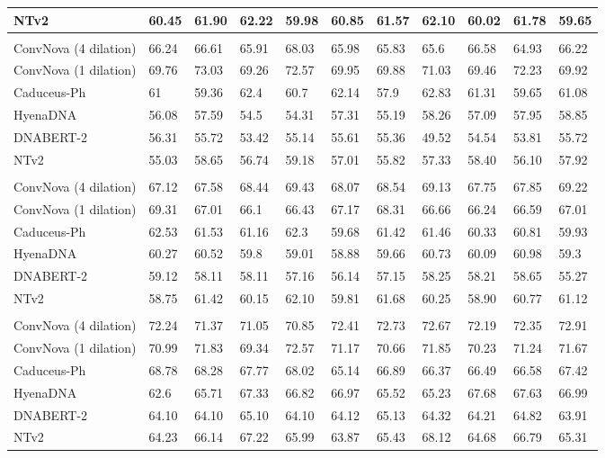 \begin{table}[htbp]
{\begin{tabular}{lllllllllll}
    NTv2 & 60.45 & 61.90 & 62.22 & 59.98 & 60.85 & 61.57 & 62.10 & 60.02 & 61.78 & 59.65 \\
    \midrule
    \rowcolor{titlebg}\multicolumn{11}{l}{\textit{\textbf{H3K14ac}}} \\
    \rowcolor{low}ConvNova (4 dilation) & 66.24 & 66.61 & 65.91 & 68.03 & 65.98 & 65.83 & 65.6  & 66.58 & 64.93 & 66.22 \\
    \rowcolor{low}ConvNova (1 dilation) & 69.76 & 73.03 & 69.26 & 72.57 & 69.95 & 69.88 & 71.03 & 69.46 & 72.23 & 69.92 \\
    Caduceus-Ph& 61    & 59.36 & 62.4  & 60.7  & 62.14 & 57.9  & 62.83 & 61.31 & 59.65 & 61.08 \\
    HyenaDNA  & 56.08 & 57.59 & 54.5  & 54.31 & 57.31 & 55.19 & 58.26 & 57.09 & 57.95 & 58.85 \\
    DNABERT-2  & 56.31  & 55.72  & 53.42  & 55.14  & 55.61  & 55.36  & 49.52  & 54.54  & 53.81  & 55.72 \\
    NTv2 & 55.03 & 58.65 & 56.74 & 59.18 & 57.01 & 55.82 & 57.33 & 58.40 & 56.10 & 57.92 \\
    \midrule
    \rowcolor{titlebg}\multicolumn{11}{l}{\textit{\textbf{H3K36me3}}} \\
    \rowcolor{low}ConvNova (4 dilation)  & 67.12 & 67.58 & 68.44 & 69.43 & 68.07 & 68.54 & 69.13 & 67.75 & 67.85 & 69.22 \\
    \rowcolor{low}ConvNova (1 dilation)  & 69.31 & 67.01 & 66.1  & 66.43 & 67.17 & 68.31 & 66.66 & 66.24 & 66.59 & 67.01 \\
    Caduceus-Ph & 62.53 & 61.53 & 61.16 & 62.3  & 59.68 & 61.42 & 61.46 & 60.33 & 60.81 & 59.93 \\
    HyenaDNA & 60.27 & 60.52 & 59.8  & 59.01 & 58.88 & 59.66 & 60.73 & 60.09 & 60.98 & 59.3 \\
    DNABERT-2  & 59.12  & 58.11  & 58.11  & 57.16  & 56.14  & 57.15  & 58.25  & 58.21  & 58.65  & 55.27 \\
    NTv2 & 58.75 & 61.42 & 60.15 & 62.10 & 59.81 & 61.68 & 60.25 & 58.90 & 60.77 & 61.12 \\
    \midrule
    \rowcolor{titlebg}\multicolumn{11}{l}{\textit{\textbf{H3K79me3}}} \\
    \rowcolor{low}ConvNova (4 dilation)  & 72.24 & 71.37 & 71.05 & 70.85 & 72.41 & 72.73 & 72.67 & 72.19 & 72.35 & 72.91 \\
    \rowcolor{low}ConvNova (1 dilation)  & 70.99 & 71.83 & 69.34 & 72.57 & 71.17 & 70.66 & 71.85 & 70.23 & 71.24 & 71.67 \\
    Caduceus-Ph& 68.78 & 68.28 & 67.77 & 68.02 & 65.14 & 66.89 & 66.37 & 66.49 & 66.58 & 67.42 \\
    HyenaDNA & 62.6  & 65.71 & 67.33 & 66.82 & 66.97 & 65.52 & 65.23 & 67.68 & 67.63 & 66.99 \\
    DNABERT-2  & 64.10  & 64.10  & 65.10  & 64.10  & 64.12  & 65.13  & 64.32  & 64.21  & 64.82  & 63.91 \\
    NTv2 & 64.23 & 66.14 & 67.22 & 65.99 & 63.87 & 65.43 & 68.12 & 64.68 & 66.79 & 65.31 \\
    \bottomrule
    \end{tabular}}
\end{table}


